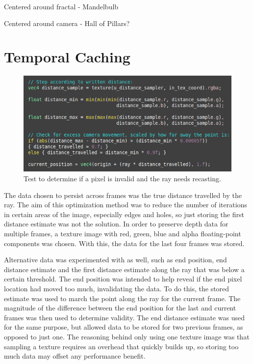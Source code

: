 Centered around fractal - Mandelbulb

Centered around camera - Hall of Pillars?

\section{Temporal Caching}

\begin{figure}[ht]
	\centering
	\includegraphics[width=0.65\linewidth, frame]{Images/Distance-Test.png}
	\caption{Test to determine if a pixel is invalid and the ray needs recasting.}
	\label{figure:distance-test}
\end{figure}

The data chosen to persist across frames was the true distance travelled by the ray. The aim of this optimization method was to reduce the number of iterations in certain areas of the image, especially edges and holes, so just storing the first distance estimate was not the solution. In order to preserve depth data for multiple frames, a texture image with red, green, blue and alpha floating-point components was chosen. With this, the data for the last four frames was stored.\newline

Alternative data was experimented with as well, such as end position, end distance estimate and the first distance estimate along the ray that was below a certain threshold. The end position was intended to help reveal if the end pixel location had moved too much, invalidating the data. To do this, the stored estimate was used to march the point along the ray for the current frame. The magnitude of the difference between the end position for the last and current frames was then used to determine validity. The end distance estimate was used for the same purpose, but allowed data to be stored for two previous frames, as opposed to just one. The reasoning behind only using one texture image was that sampling a texture requires an overhead that quickly builds up, so storing too much data may offset any performance benefit.\newline

